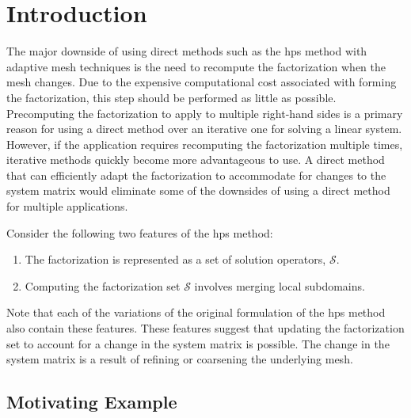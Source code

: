 \section{Introduction}

The major downside of using direct methods such as the \gls{hps} method with adaptive mesh techniques is the need to recompute the factorization when the mesh changes. Due to the expensive computational cost associated with forming the factorization, this step should be performed as little as possible. Precomputing the factorization to apply to multiple right-hand sides is a primary reason for using a direct method over an iterative one for solving a linear system. However, if the application requires recomputing the factorization multiple times, iterative methods quickly become more advantageous to use. A direct method that can efficiently adapt the factorization to accommodate for changes to the system matrix would eliminate some of the downsides of using a direct method for multiple applications.


Consider the following two features of the \gls{hps} method:
\begin{enumerate}
    \item{The factorization is represented as a set of solution operators, $\mathcal{S}$.}
    \item{Computing the factorization set $\mathcal{S}$ involves merging local subdomains.}
\end{enumerate}
Note that each of the variations of the original formulation of the \gls{hps} method also contain these features. These features suggest that updating the factorization set to account for a change in the system matrix is possible. The change in the system matrix is a result of refining or coarsening the underlying mesh.

\subsection{Motivating Example}

